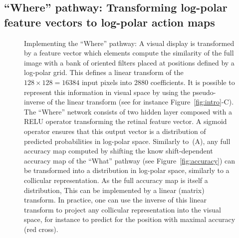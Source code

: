 \subsection{``Where'' pathway: Transforming log-polar feature vectors to log-polar action maps}
\begin{figure}[t!]%
	\caption{Implementing the ``Where'' pathway: \A A visual display is transformed by a feature vector which elements compute the similarity of the full image with a bank of oriented filters placed at positions defined by a log-polar grid. This defines a linear transform of the $128\times128=16384$ input pixels into $2880$ coefficients. It is possible to represent this information in visual space by using the pseudo-inverse of the linear transform (see for instance Figure~\ref{fig:intro}-C).
	\B The ``Where'' network consists of two hidden layer composed with a RELU operator transforming the retinal feature vector. A sigmoid operator ensures that this output vector is a distribution of predicted probabilities in log-polar space.  %
	\C Similarly to~(A), any full accuracy map computed by shifting the know shift-dependent accuracy map of the ``What'' pathway (see Figure~\ref{fig:accuracy}) can be transformed into a distribution in log-polar space, similarly to a collicular representation. As the full accuracy map is itself a distribution, This can be implemented by a linear (matrix) transform. In practice, one can use the inverse of this linear transform to project any  collicular representation into the visual space, for instance to predict for the position with maximal accuracy (red cross).
	}
\label{fig:where}
\end{figure}
%
%
%
